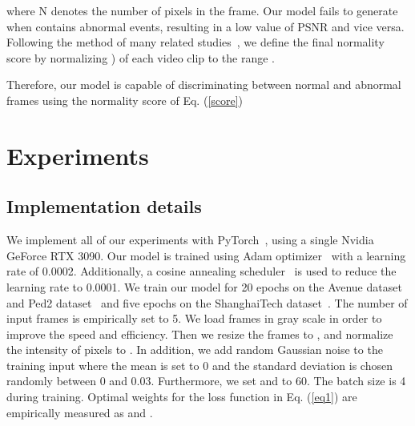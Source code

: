 \documentclass[10pt,twocolumn,letterpaper]{article}
\begin{document}
where N denotes the number of pixels in the frame. Our model fails to generate when  contains abnormal events, resulting in a low value of PSNR and vice versa. Following the method of many related studies~\cite{chong2017abnormal, gong2019memorizing, hasan2016learning, lee2018stan, Liu_2018_CVPR,luo2017revisit, park2020learning, ravanbakhsh2019training}, we define the final normality score  by normalizing ) of each video clip to the range . 


Therefore, our model is capable of discriminating between normal and abnormal frames using the normality score of Eq. (\ref{score})

\section{Experiments}


\subsection{Implementation details}
We implement all of our experiments with PyTorch~\cite{paszke2017automatic}, using a single Nvidia GeForce RTX 3090. Our model is trained using Adam optimizer~\cite{kingma2014adam} with a learning rate of 0.0002. Additionally, a cosine annealing scheduler~\cite{loshchilov2016sgdr} is used to reduce the learning rate to 0.0001. We train our model for 20 epochs on the Avenue dataset~\cite{lu2013abnormal} and Ped2 dataset~\cite{mahadevan2010anomaly} and five epochs on the ShanghaiTech dataset~\cite{luo2017revisit}. The number of input frames  is empirically set to 5. We load frames in gray scale in order to improve the speed and efficiency. Then we resize the frames to , and normalize the intensity of pixels to . In addition, we add random Gaussian noise to the training input where the mean is set to 0 and the standard deviation is chosen randomly between 0 and 0.03. Furthermore, we set  and  to 60. The batch size is 4 during training. Optimal weights for the loss function in Eq. (\ref{eq1}) are empirically measured as  and .
\\
\end{document}
